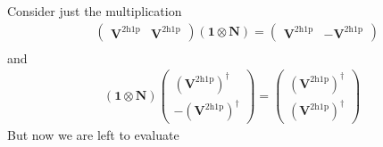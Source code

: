Consider just the multiplication 
\begin{align}
&\begin{pmatrix} 
        \bm{V}^{2\mathrm{h1p}} & \bm{V}^{2\mathrm{h1p}}
    \end{pmatrix}  \left(\bm{1}\otimes \bm{N}\right) =\begin{pmatrix} 
        \bm{V}^{2\mathrm{h1p}} & -\bm{V}^{2\mathrm{h1p}}
    \end{pmatrix} \\
\end{align}
and
\begin{align}
\left(\bm{1}\otimes \bm{N}\right)
    \begin{pmatrix} 
        \left(\bm{V}^{2\mathrm{h1p}}\right)^{\dagger} \\ 
        -\left(\bm{V}^{2\mathrm{h1p}}\right)^{\dagger} 
    \end{pmatrix} =
    \begin{pmatrix} 
        \left(\bm{V}^{2\mathrm{h1p}}\right)^{\dagger} \\ 
        \left(\bm{V}^{2\mathrm{h1p}}\right)^{\dagger} 
    \end{pmatrix}
\end{align}
But now we are left to evaluate
